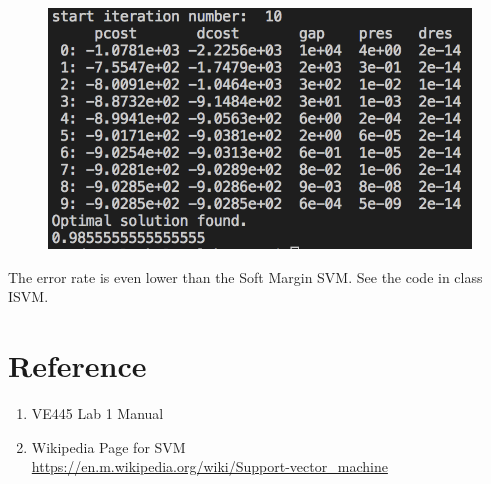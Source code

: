 \documentclass[12pt]{article}
\begin{document}
\begin{figure}[H]
\centering
\includegraphics[width=0.5\linewidth]{ISVM.png}
\end{figure}

The error rate is even lower than the Soft Margin SVM. See the code in class ISVM.
\section{Reference}

\begin{enumerate}
\item VE445 Lab 1 Manual
\item Wikipedia Page for SVM \\\url{https://en.m.wikipedia.org/wiki/Support-vector_machine}
\end{enumerate}
\end{document}
